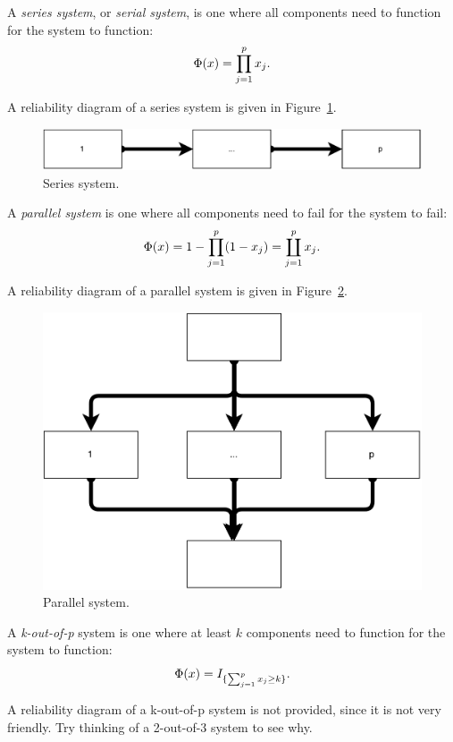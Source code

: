\begin{definition}
A \emph{series system}, or \emph{serial system}, is one where all components need to function for the system to function: $$\Phi(x)=\prod_{j=1}^{p}x_j.$$
\end{definition}
A reliability diagram of a series system is given in Figure~\ref{fig:series_system}.
\begin{figure}[ht]
\centering
\includegraphics[width=0.5\linewidth]{art/series_system}
\caption{Series system.}
\label{fig:series_system}
\end{figure}


\begin{definition}
A \emph{parallel system} is one where all components need to fail for the system to fail:
$$\Phi(x)=1-\prod_{j=1}^{p} (1-x_j)= \coprod_{j=1}^p x_j.$$
\end{definition}
A reliability diagram of a parallel system is given in Figure~\ref{fig:parallel_system}.
\begin{figure}[ht]
\centering
\includegraphics[width=0.5\linewidth]{art/parallel_system}
\caption{Parallel system.}
\label{fig:parallel_system}
\end{figure}





\begin{definition}
A \emph{k-out-of-p} system is one where at least $k$ components need to function for the system to function:
$$\Phi(x)=I_{\{ \sum_{j=1}^{p} x_j \geq k \}}.$$
\end{definition}



\begin{think}
	A reliability diagram of a k-out-of-p system is not provided, since it is not very friendly. Try thinking of a 2-out-of-3 system to see why.
\end{think}



